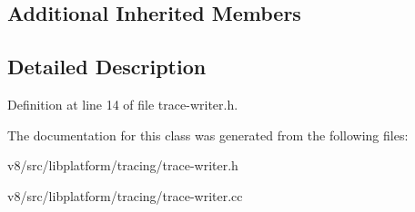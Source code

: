 \subsection*{Additional Inherited Members}


\subsection{Detailed Description}


Definition at line 14 of file trace-\/writer.\+h.



The documentation for this class was generated from the following files\+:\begin{DoxyCompactItemize}
\item 
v8/src/libplatform/tracing/trace-\/writer.\+h\item 
v8/src/libplatform/tracing/trace-\/writer.\+cc\end{DoxyCompactItemize}
